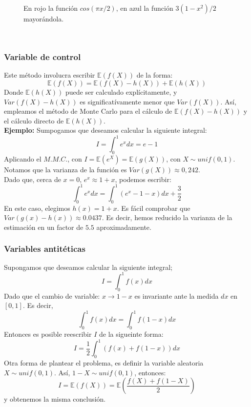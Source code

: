\documentclass[a4paper]{article}
\numberwithin{equation}{subsection}
\def\E{\mathbb E}
\begin{document}
\begin{figure}[h!]
    \centering
    \caption{En rojo la función $cos(\pi x/2)$, en azul la función $3(1-x^2)/2$ mayorándola.}
\end{figure}\\

\subsubsection{Variable de control}
Este método involucra escribir $\E(f(X))$ de la forma:
\[\E\left(f(X)\right) = \E\left(f(X)-h(X)\right) + \E\left(h(X)\right)\]
Donde $\E\left(h(X)\right)$ puede ser calculado explícitamente, y $Var\left(f(X)-h(X)\right)$ es significatívamente menor que $Var\left(f(X)\right)$. Así, empleamos el método de Monte Carlo para el cálculo de $\E\left(f(X)-h(X)\right)$ y el cálculo directo de $\E\left(h(X)\right)$.\\ \newline
\textbf{Ejemplo: }Sumpogamos que deseamos calcular la siguiente integral:
\[I = \int_{0}^1 e^x dx = e-1\]
Aplicando el $M.M.C.$, con $I=\E(e^X) = \E(g(X))$, con $X\sim unif(0,1)$. Notamos que la varianza de la función es $Var(g(X)) \approx 0,242$.\\
Dado que, cerca de $x=0$, $e^x \approx 1+x$, podemos escribir:
\[\int_{0}^1 e^x dx = \int_{0}^1 (e^x -1-x)dx + \frac{3}{2}\]
En este caso, elegimos $h(x)=1+x$. Es fácil comprobar que $Var\left(g(x)-h(x)\right) \approx 0.0437$. Es decir, hemos reducido la varianza de la estimación en un factor de $5.5$ aproximadamente.

\subsubsection{Variables antitéticas}
Supongamos que deseamos calcular la siguiente integral;
\[I =   \int_{0}^1 f(x)dx\]
Dado que el cambio de variable: $x\rightarrow 1-x$ es invariante ante la medida $dx$ en $[0,1]$. Es decir,
\[\int_{0}^1f(x)dx = \int_{0}^1f(1-x)dx\]
Entonces es posible reescribir $I$ de la sigueinte forma:
\[I = \frac{1}{2}\int_{0}^1 (f(x) + f(1-x))dx\]
Otra forma de plantear el problema, es definir la variable aleatoria $X\sim unif(0,1)$. Así, $1-X \sim unif(0,1)$, entonces:
\[I = \E(f(X)) = \E\left(\frac{f(X)+f(1-X)}{2}\right)\]
y obtenemos la misma conclusión.\\ \newline
\end{document}
